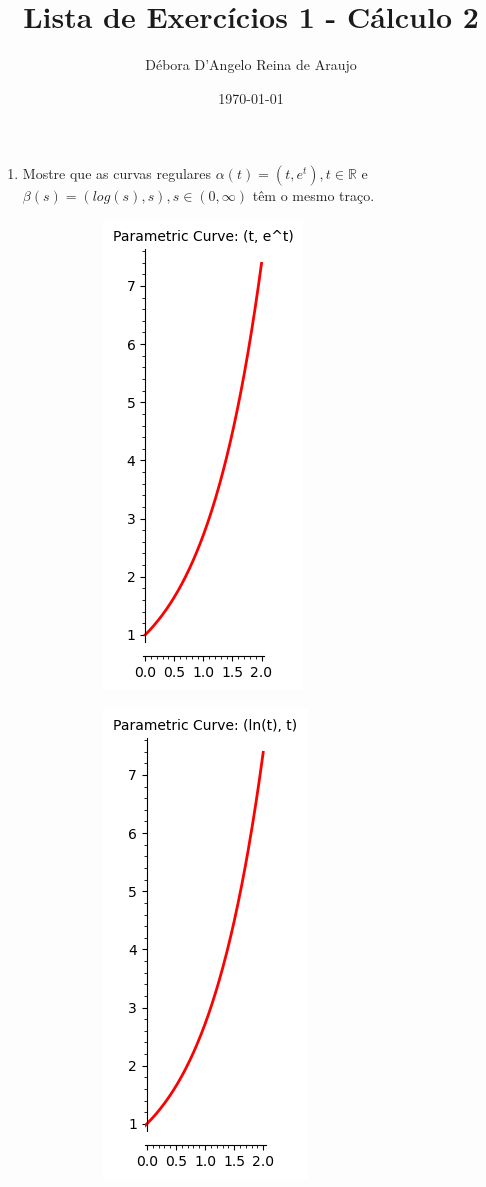 \documentclass{article}
\begin{document}
\title{Lista de Exercícios 1 - Cálculo 2}
\author{Débora D'Angelo Reina de Araujo}
\date{\today}

\maketitle

\begin{enumerate}
    \item Mostre que as curvas regulares $\alpha(t) = (t, e^t), t \in \mathbb{R}$ e $\beta(s)=(log(s),s),s \in (0, \infty)$ têm o mesmo traço. \\
    
    \begin{figure}[!htb]
        \centering 

        \begin{subfigure}{\textwidth} %
            \centering
            \includegraphics[width=0.3\linewidth]{imgs/curve1.png} %
            \label{fig:imagem1}
        \end{subfigure}
        \begin{subfigure}{\textwidth} %
            \centering
            \includegraphics[width=0.3\linewidth]{imgs/curve2.png} %
            \label{fig:imagem2}
        \end{subfigure}
        \label{fig:exemplo_duas_imagens} %
    \end{figure}


\end{enumerate}
\end{document}
